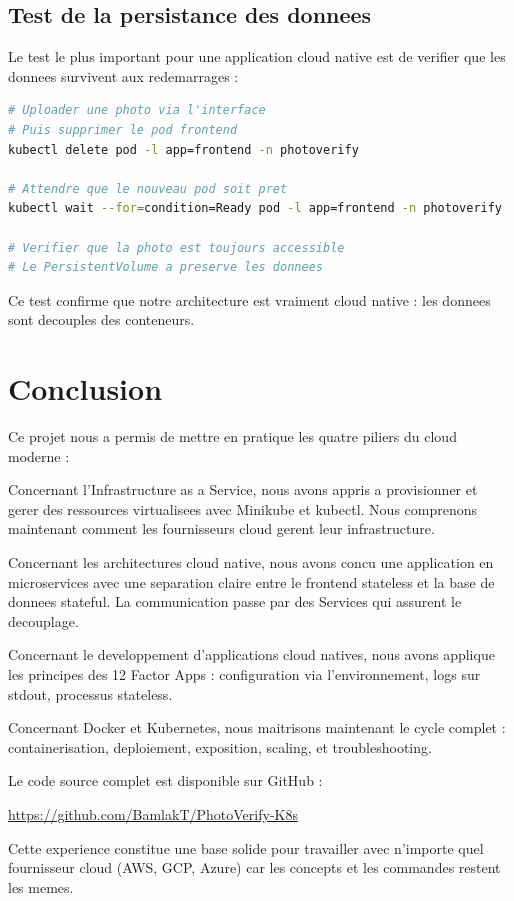 \documentclass[12pt,a4paper]{article}
\begin{document}
\subsection{Test de la persistance des donnees}

Le test le plus important pour une application cloud native est de verifier que les donnees survivent aux redemarrages :

\begin{lstlisting}[language=bash, caption={Test de persistance}]
# Uploader une photo via l'interface
# Puis supprimer le pod frontend
kubectl delete pod -l app=frontend -n photoverify

# Attendre que le nouveau pod soit pret
kubectl wait --for=condition=Ready pod -l app=frontend -n photoverify

# Verifier que la photo est toujours accessible
# Le PersistentVolume a preserve les donnees
\end{lstlisting}

Ce test confirme que notre architecture est vraiment cloud native : les donnees sont decouples des conteneurs.

\section{Conclusion}

Ce projet nous a permis de mettre en pratique les quatre piliers du cloud moderne :

Concernant l'Infrastructure as a Service, nous avons appris a provisionner et gerer des ressources virtualisees avec Minikube et kubectl. Nous comprenons maintenant comment les fournisseurs cloud gerent leur infrastructure.

Concernant les architectures cloud native, nous avons concu une application en microservices avec une separation claire entre le frontend stateless et la base de donnees stateful. La communication passe par des Services qui assurent le decouplage.

Concernant le developpement d'applications cloud natives, nous avons applique les principes des 12 Factor Apps : configuration via l'environnement, logs sur stdout, processus stateless.

Concernant Docker et Kubernetes, nous maitrisons maintenant le cycle complet : containerisation, deploiement, exposition, scaling, et troubleshooting.

Le code source complet est disponible sur GitHub :

\begin{center}
\url{https://github.com/BamlakT/PhotoVerify-K8s}
\end{center}

Cette experience constitue une base solide pour travailler avec n'importe quel fournisseur cloud (AWS, GCP, Azure) car les concepts et les commandes restent les memes.
\end{document}
